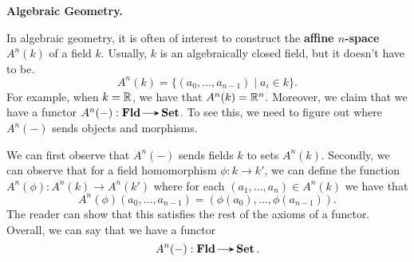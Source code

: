 


    {\large\noindent \textbf{Algebraic Geometry.}\par}

    \begin{example}
        In algebraic geometry, it is often of interest to construct the \textbf{affine $n$-space}
        $A^n(k)$ of a field $k$. Usually, $k$ is an algebraically closed field, but it doesn't have to be.
        \[
            A^n(k) = \{(a_0, \dots, a_{n-1}) \mid a_i \in k \}.
        \]  
        For example, when $k = \mathbb{R}$, we have that $A^n(k) = \mathbb{R}^n$. 
        Moreover, we claim that we have a functor $A^n(-): \fld \to \Set$.
        To see this, we need to figure out where $A^n(-)$ sends objects and morphisms.
        
        We can first observe that $A^n(-)$ sends fields $k$ to sets $A^n(k)$.
        Secondly, we can observe that for a field homomorphism $\phi: k \to k'$,    
        we can define the function $A^n(\phi): A^n(k) \to A^n(k')$ where
        for each $(a_1, \dots, a_n) \in A^n(k)$ we have that
        \[
            A^n(\phi)(a_0, \dots, a_{n-1}) = (\phi(a_0), \dots,  \phi(a_{n-1})).
        \] 
        The reader can show that this satisfies the rest of the axioms of a functor. Overall, 
        we can say that we have a functor 
        \[
            A^n(-): \fld \to \Set.  
        \]
    \end{example}

